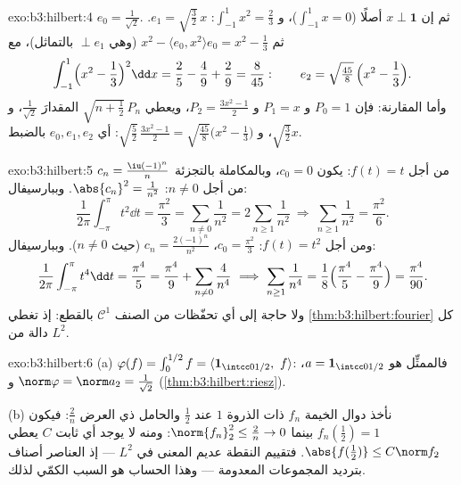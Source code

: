 \begin{solution}{exo:b3:hilbert:4}
$e_0 = \frac1{\sqrt2}$. ثم إن $x \perp \mathbf 1$ أصلًا ($\int_{-1}^1x = 0$)، و $\int_{-1}^1x^2 = \frac23$: $e_1 =
\sqrt{\tfrac32}\,x$. ثم
$x^2 - \langle e_0, x^2\rangle e_0 =
x^2 - \frac13$ (وهي $\perp e_1$ بالتماثل)، مع
\[
\int_{-1}^1\Bigl(x^2 - \frac13\Bigr)^2\dd x = \frac25 -
\frac49 + \frac29 = \frac{8}{45}:
\qquad e_2 = \sqrt{\tfrac{45}8}\,\Bigl(x^2 - \frac13\Bigr).
\]
وأما المقارنة: فإن $P_0 = 1$ و $P_1 = x$ و $P_2 = \frac{3x^2 - 1}2$، ويعطي
$\sqrt{n + \tfrac12}\,P_n$ المقدارَ $\frac1{\sqrt2}$، و $\sqrt{\frac32}x$، و $\sqrt{\frac52}\,\frac{3x^2-1}2 =
\sqrt{\frac{45}8}\bigl(x^2 - \frac13\bigr)$: أي
$e_0, e_1,
e_2$ بالضبط.
\end{solution}

\begin{solution}{exo:b3:hilbert:5}
من أجل $f(t) = t$: يكون $c_0 = 0$، وبالمكاملة بالتجزئة $c_n =
\frac{\iu(-1)^n}{n}$
من أجل $n \neq 0$: $\abs{c_n}^2 =
\frac1{n^2}$. وببارسيفال:
\[
\frac1{2\pi}\int_{-\pi}^\pi t^2\dd t = \frac{\pi^2}3
= \sum_{n\neq0}\frac1{n^2} = 2\sum_{n\geq1}\frac1{n^2}
\ \Longrightarrow\ \sum_{n\geq1}\frac1{n^2} = \frac{\pi^2}6 .
\]
ومن أجل $f(t) = t^2$: $c_0 = \frac{\pi^2}3$، $c_n =
\frac{2(-1)^n}{n^2}$ (حيث $n \ne 0$).
وببارسيفال:
\[
\frac1{2\pi}\int_{-\pi}^{\pi}t^4\dd t = \frac{\pi^4}5
= \frac{\pi^4}9 + \sum_{n\neq0}\frac4{n^4}
\ \Longrightarrow\
\sum_{n\geq1}\frac1{n^4} = \frac18\Bigl(\frac{\pi^4}5 -
\frac{\pi^4}9\Bigr) = \frac{\pi^4}{90} .
\]
ولا حاجة إلى أي تحفّظات من الصنف $\mathcal C^1$ بالقطع: إذ
تغطي \cref{thm:b3:hilbert:fourier} كل دالة من $L^2$.
\end{solution}

\begin{solution}{exo:b3:hilbert:6}
(a) $\varphi(f) = \int_0^{1/2}f = \langle\mathbf
1_{\intcc0{1/2}},\ f\rangle$: فالممثِّل هو $a =
\mathbf 1_{\intcc0{1/2}}$، و $\norm\varphi = \norm a_2 =
\frac1{\sqrt2}$ (\cref{thm:b3:hilbert:riesz}).

(b) نأخذ دوال الخيمة $f_n$ ذات الذروة $1$ عند $\frac12$ والحامل
ذي العرض $\frac2n$: فيكون $f_n(\tfrac12) = 1$ بينما $\norm{f_n}_2^2 \leq \frac2n \to 0$: ومنه لا يوجد أي
ثابت $C$ يعطي $\abs{f(\frac12)} \leq C\norm f_2$. فتقييم النقطة عديم المعنى في $L^2$ ---
إذ العناصر أصناف بترديد المجموعات المعدومة --- وهذا الحساب هو
السبب الكمّي لذلك.
\end{solution}

